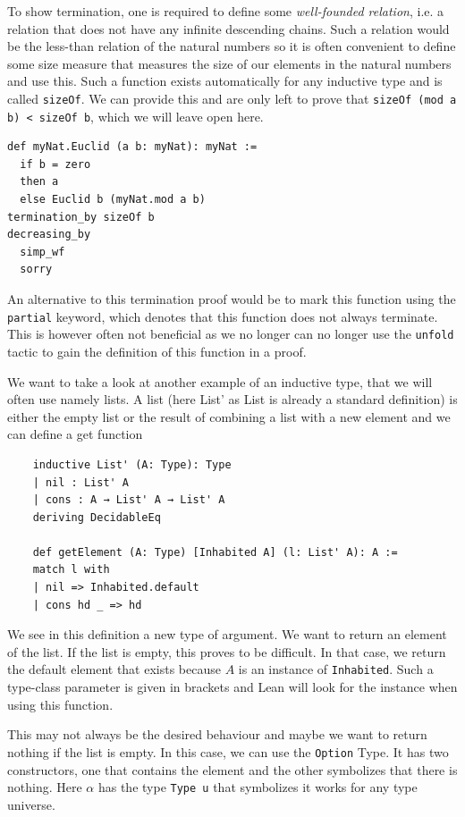 To show termination, one is required to define some \textit{well-founded relation}, i.e. a relation that does not have any infinite descending chains. Such a relation would be the less-than relation of the natural numbers so it is often convenient to define some size measure that measures the size of our elements in the natural numbers and use this. Such a function exists automatically for any inductive type and is called \lstinline|sizeOf|. We can provide this and are only left to prove that \lstinline|sizeOf (mod a b) < sizeOf b|, which we will leave open here.

\begin{lstlisting}
def myNat.Euclid (a b: myNat): myNat :=
  if b = zero
  then a
  else Euclid b (myNat.mod a b)
termination_by sizeOf b
decreasing_by
  simp_wf
  sorry
\end{lstlisting}

An alternative to this termination proof would be to mark this function using the \lstinline|partial| keyword, which denotes that this function does not always terminate. This is however often not beneficial as we no longer can no longer use the \lstinline|unfold| tactic to gain the definition of this function in a proof.



We want to take a look at another example of an inductive type, that we will often use namely lists. A list (here List' as List is already a standard definition) is either the empty list or the result of combining a list with a new element and we can define a get function

\begin{lstlisting}
    inductive List' (A: Type): Type
    | nil : List' A
    | cons : A → List' A → List' A
    deriving DecidableEq

    def getElement (A: Type) [Inhabited A] (l: List' A): A :=
    match l with
    | nil => Inhabited.default
    | cons hd _ => hd
\end{lstlisting}

We see in this definition a new type of argument. We want to return an element of the list. If the list is empty, this proves to be difficult. In that case, we return the default element that exists because $A$ is an instance of \lstinline|Inhabited|. Such a type-class parameter is given in brackets and Lean will look for the instance when using this function.

This may not always be the desired behaviour and maybe we want to return nothing if the list is empty. In this case, we can use the \lstinline|Option| Type. It has two constructors, one that contains the element and the other symbolizes that there is nothing. Here $\alpha$ has the type \lstinline|Type u| that symbolizes it works for any type universe.


